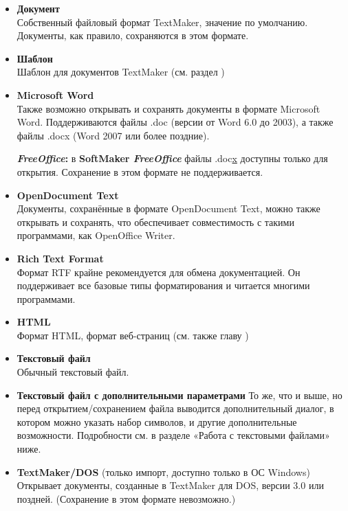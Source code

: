 ﻿\documentclass[a4paper,10pt]{article}
\begin{document}
\begin{itemize}
 \item \textbf{Документ}\\
 Собственный файловый формат TextMaker, значение по умолчанию. Документы, как правило, сохраняются в этом формате.
  \item \textbf{Шаблон}\\
 Шаблон для документов TextMaker (см. раздел )
 \item \textbf{Microsoft Word}\\
 Также возможно открывать и сохранять документы в формате Microsoft Word. Поддерживаются файлы .doc (версии от Word 6.0 до 2003), а также файлы .docx (Word 2007 или более поздние).
 
 \begin{mdframed}[backgroundcolor=pink!50]
\textbf{\textit{FreeOffice}:} в \textbf{SoftMaker \textit{FreeOffice}} файлы .doc\underline{x} доступны только для открытия. Сохранение в этом формате не поддерживается.
\end{mdframed}
\item \textbf{OpenDocument Text}\\
Документы, сохранённые в формате OpenDocument Text, можно также открывать и сохранять, что обеспечивает совместимость с такими программами, как OpenOffice Writer.
\item \textbf{Rich Text Format}\\
Формат RTF крайне рекомендуется для обмена документацией. Он поддерживает все базовые типы форматирования и читается многими программами.
\item \textbf{HTML}\\
Формат HTML, формат веб-страниц (см. также главу )
\item \textbf{Текстовый файл}\\
Обычный текстовый файл.
\item \textbf{Текстовый файл с дополнительными параметрами}
То же, что и выше, но перед открытием/сохранением файла выводится дополнительный диалог, в котором можно указать набор символов, и другие дополнительные возможности. Подробности см. в разделе «Работа с текстовыми файлами» ниже.
\item \textbf{TextMaker/DOS} (только импорт, доступно только в ОС Windows)
Открывает документы, созданные в TextMaker для DOS, версии 3.0 или поздней. (Сохранение в этом формате невозможно.)
\end{itemize}
\end{document}
